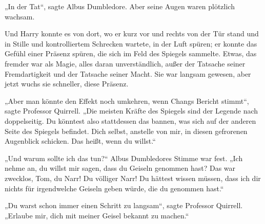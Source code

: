 „In der Tat“, sagte Albus Dumbledore.
Aber seine Augen waren plötzlich wachsam.

Und Harry konnte es von dort, wo er kurz vor und rechts von der Tür stand und in Stille und kontrolliertem Schrecken wartete, in der Luft spüren; er konnte das Gefühl einer Präsenz spüren, die sich im Feld des Spiegels sammelte. Etwas, das fremder war als Magie, alles daran unverständlich, außer der Tatsache seiner Fremdartigkeit und der Tatsache seiner Macht. Sie war langsam gewesen, aber jetzt wuchs sie schneller, diese Präsenz.

„Aber man könnte den Effekt noch umkehren, wenn Changs Bericht stimmt“, sagte Professor Quirrell.
„Die meisten Kräfte des Spiegels sind der Legende nach doppelseitig. Du könntest also stattdessen das bannen, was sich auf der anderen Seite des Spiegels befindet. Dich selbst, anstelle von mir, in diesen gefrorenen Augenblick schicken. Das heißt, wenn du willst.“

„Und warum sollte ich das tun?“ Albus Dumbledores Stimme war fest.
„Ich nehme an, du willst mir sagen, dass du Geiseln genommen hast? Das war zwecklos, Tom, du Narr! Du völliger Narr! Du hättest wissen müssen, dass ich dir nichts für irgendwelche Geiseln geben würde, die du genommen hast.“

„Du warst schon immer einen Schritt zu langsam“, sagte Professor Quirrell.
„Erlaube mir, dich mit meiner Geisel bekannt zu machen.“

